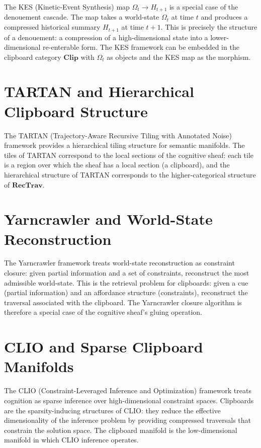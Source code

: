 \documentclass[12pt,oneside]{book}
\theoremstyle{plain}
\theoremstyle{definition}
\theoremstyle{plain}
\newcommand{\Clip}{\mathbf{Clip}}
\newcommand{\RecTrav}{\mathbf{RecTrav}}
\begin{document}
The KES (Kinetic-Event Synthesis) map $\Omega_t \to H_{t+1}$ is a special case of the denouement cascade. The map takes a world-state $\Omega_t$ at time $t$ and produces a compressed historical summary $H_{t+1}$ at time $t+1$. This is precisely the structure of a denouement: a compression of a high-dimensional state into a lower-dimensional re-enterable form. The KES framework can be embedded in the clipboard category $\Clip$ with $\Omega_t$ as objects and the KES map as the morphism.

\section{TARTAN and Hierarchical Clipboard Structure}

The TARTAN (Trajectory-Aware Recursive Tiling with Annotated Noise) framework provides a hierarchical tiling structure for semantic manifolds. The tiles of TARTAN correspond to the local sections of the cognitive sheaf: each tile is a region over which the sheaf has a local section (a clipboard), and the hierarchical structure of TARTAN corresponds to the higher-categorical structure of $\RecTrav$.

\section{Yarncrawler and World-State Reconstruction}

The Yarncrawler framework treats world-state reconstruction as constraint closure: given partial information and a set of constraints, reconstruct the most admissible world-state. This is the retrieval problem for clipboards: given a cue (partial information) and an affordance structure (constraints), reconstruct the traversal associated with the clipboard. The Yarncrawler closure algorithm is therefore a special case of the cognitive sheaf's gluing operation.

\section{CLIO and Sparse Clipboard Manifolds}

The CLIO (Constraint-Leveraged Inference and Optimization) framework treats cognition as sparse inference over high-dimensional constraint spaces. Clipboards are the sparsity-inducing structures of CLIO: they reduce the effective dimensionality of the inference problem by providing compressed traversals that constrain the solution space. The clipboard manifold is the low-dimensional manifold in which CLIO inference operates.
\end{document}
